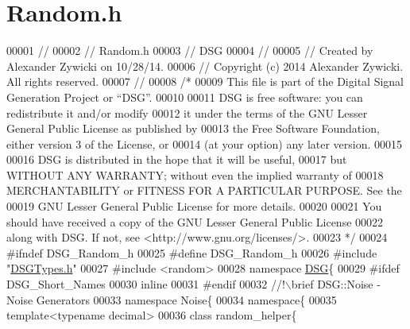 \hypertarget{_random_8h_source}{\section{Random.\+h}
\label{_random_8h_source}
}

\begin{DoxyCode}
00001 \textcolor{comment}{//}
00002 \textcolor{comment}{//  Random.h}
00003 \textcolor{comment}{//  DSG}
00004 \textcolor{comment}{//}
00005 \textcolor{comment}{//  Created by Alexander Zywicki on 10/28/14.}
00006 \textcolor{comment}{//  Copyright (c) 2014 Alexander Zywicki. All rights reserved.}
00007 \textcolor{comment}{//}
00008 \textcolor{comment}{/*}
00009 \textcolor{comment}{ This file is part of the Digital Signal Generation Project or “DSG”.}
00010 \textcolor{comment}{}
00011 \textcolor{comment}{ DSG is free software: you can redistribute it and/or modify}
00012 \textcolor{comment}{ it under the terms of the GNU Lesser General Public License as published by}
00013 \textcolor{comment}{ the Free Software Foundation, either version 3 of the License, or}
00014 \textcolor{comment}{ (at your option) any later version.}
00015 \textcolor{comment}{}
00016 \textcolor{comment}{ DSG is distributed in the hope that it will be useful,}
00017 \textcolor{comment}{ but WITHOUT ANY WARRANTY; without even the implied warranty of}
00018 \textcolor{comment}{ MERCHANTABILITY or FITNESS FOR A PARTICULAR PURPOSE.  See the}
00019 \textcolor{comment}{ GNU Lesser General Public License for more details.}
00020 \textcolor{comment}{}
00021 \textcolor{comment}{ You should have received a copy of the GNU Lesser General Public License}
00022 \textcolor{comment}{ along with DSG.  If not, see <http://www.gnu.org/licenses/>.}
00023 \textcolor{comment}{ */}
00024 \textcolor{preprocessor}{#ifndef DSG\_Random\_h}
00025 \textcolor{preprocessor}{#define DSG\_Random\_h}
00026 \textcolor{preprocessor}{#include "\hyperlink{_d_s_g_types_8h}{DSGTypes.h}"}
00027 \textcolor{preprocessor}{#include <random>}
00028 \textcolor{keyword}{namespace }\hyperlink{namespace_d_s_g}{DSG}\{
00029 \textcolor{preprocessor}{#ifdef DSG\_Short\_Names}
00030     \textcolor{keyword}{inline}
00031 \textcolor{preprocessor}{#endif}
00032 \textcolor{comment}{    //!\(\backslash\)brief DSG::Noise - Noise Generators}
00033 \textcolor{comment}{}    \textcolor{keyword}{namespace }Noise\{
00034         \textcolor{keyword}{namespace}\{
00035             \textcolor{keyword}{template}<\textcolor{keyword}{typename} decimal>
00036             \textcolor{keyword}{class }random\_helper\{

\end{DoxyCode}
